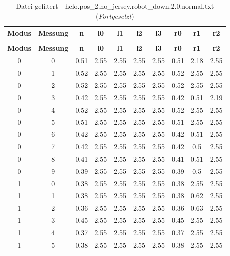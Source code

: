 \begin{longtable}{|c|c||c||c|c|c|c||c|c|c|}
	\caption{Datei gefiltert - helo.pos\_2.no\_jersey.robot\_down.2.0.normal.txt} \label{tab:helo.pos-2.no-jersey.robot-down.2.0.normal.txt} \\ \hline
	\textbf{Modus} & \textbf{Messung} & \textbf{n} & \textbf{l0} & \textbf{l1} & \textbf{l2} & \textbf{l3} & \textbf{r0} & \textbf{r1} & \textbf{r2}\\ \hline
	\endfirsthead
	\caption[]{Datei gefiltert - helo.pos\_2.no\_jersey.robot\_down.2.0.normal.txt (\emph{Fortgesetzt})} \\ \hline
	\textbf{Modus} & \textbf{Messung} & \textbf{n} & \textbf{l0} & \textbf{l1} & \textbf{l2} & \textbf{l3} & \textbf{r0} & \textbf{r1} & \textbf{r2}\\ \hline
	\endhead
	0 & 0 & 0.51 & 2.55 & 2.55 & 2.55 & 2.55 & 0.51 & 2.18 & 2.55 \\ \hline
	0 & 1 & 0.52 & 2.55 & 2.55 & 2.55 & 2.55 & 0.52 & 2.55 & 2.55 \\ \hline
	0 & 2 & 0.52 & 2.55 & 2.55 & 2.55 & 2.55 & 0.52 & 2.55 & 2.55 \\ \hline
	0 & 3 & 0.42 & 2.55 & 2.55 & 2.55 & 2.55 & 0.42 & 0.51 & 2.19 \\ \hline
	0 & 4 & 0.52 & 2.55 & 2.55 & 2.55 & 2.55 & 0.52 & 2.55 & 2.55 \\ \hline
	0 & 5 & 0.51 & 2.55 & 2.55 & 2.55 & 2.55 & 0.51 & 2.55 & 2.55 \\ \hline
	0 & 6 & 0.42 & 2.55 & 2.55 & 2.55 & 2.55 & 0.42 & 0.51 & 2.55 \\ \hline
	0 & 7 & 0.42 & 2.55 & 2.55 & 2.55 & 2.55 & 0.42 & 0.5 & 2.55 \\ \hline
	0 & 8 & 0.41 & 2.55 & 2.55 & 2.55 & 2.55 & 0.41 & 0.51 & 2.55 \\ \hline
	0 & 9 & 0.39 & 2.55 & 2.55 & 2.55 & 2.55 & 0.39 & 0.5 & 2.55 \\ \hline
	1 & 0 & 0.38 & 2.55 & 2.55 & 2.55 & 2.55 & 0.38 & 2.55 & 2.55 \\ \hline
	1 & 1 & 0.38 & 2.55 & 2.55 & 2.55 & 2.55 & 0.38 & 0.62 & 2.55 \\ \hline
	1 & 2 & 0.36 & 2.55 & 2.55 & 2.55 & 2.55 & 0.36 & 0.63 & 2.55 \\ \hline
	1 & 3 & 0.45 & 2.55 & 2.55 & 2.55 & 2.55 & 0.45 & 2.55 & 2.55 \\ \hline
	1 & 4 & 0.37 & 2.55 & 2.55 & 2.55 & 2.55 & 0.37 & 2.55 & 2.55 \\ \hline
	1 & 5 & 0.38 & 2.55 & 2.55 & 2.55 & 2.55 & 0.38 & 2.55 & 2.55 \\ \hline

\end{longtable}
